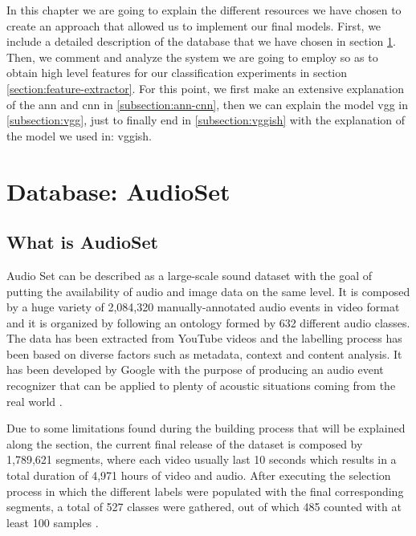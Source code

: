 
	In this chapter we are going to explain the different resources we have chosen to create an approach that allowed us to implement our final models. First, we include a detailed description of the database that we have chosen in section \ref{section:audioset}. Then, we comment and analyze the system we are going to employ so as to obtain high level features for our classification experiments in section \ref{section:feature-extractor}. For this point, we first make an extensive explanation of the \acrshort{ann} and \acrshort{cnn} in \ref{subsection:ann-cnn}, then we can explain the model \acrshort{vgg} in \ref{subsection:vgg}, just to finally end in \ref{subsection:vggish} with the explanation of the model we used in: \acrshort{vgg}ish.
	
\section{Database: AudioSet}
\label{section:audioset}

\subsection{What is AudioSet} 
\label{subsection:what-is-audioset}

	Audio Set can be described as a large-scale sound dataset with the goal of putting the availability of audio and image data on the same level. It is composed by a huge variety of 2,084,320 manually-annotated audio events in video format and it is organized by following an ontology formed by 632 different audio classes. The data has been extracted from YouTube videos and the labelling process has been based on diverse factors such as metadata, context and content analysis. It has been developed by Google with the purpose of producing an audio event recognizer that can be applied to plenty of acoustic situations coming from the real world \cite{Gemmeke2017}.
	
	Due to some limitations found during the building process that will be explained along the section, the current final release of the dataset is composed by 1,789,621 segments, where each video usually last 10 seconds which results in a total duration of 4,971 hours of video and audio. After executing the selection process in which the different labels were populated with the final corresponding segments, a total of 527 classes were gathered, out of which 485 counted with at least 100 samples \cite{Gemmeke2017} \cite{SoundUnderstandinggroup2017}.

